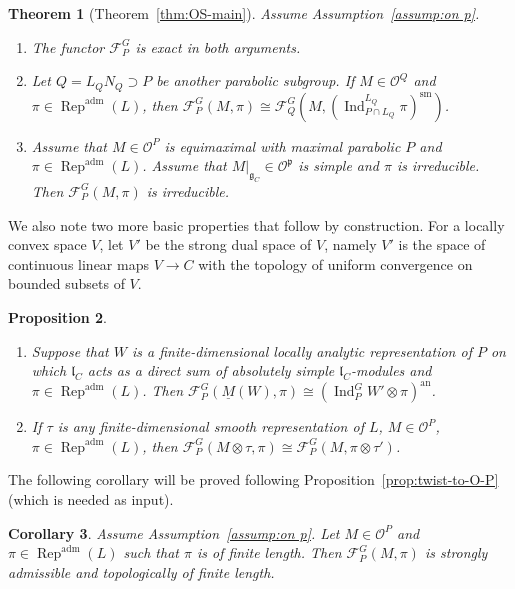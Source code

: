 \documentclass[a4paper]{amsart}
\numberwithin{equation}{section}
\newtheorem{thm}{Theorem}[section]
\newtheorem{prop}[thm]{Proposition}
\newtheorem{cor}[thm]{Corollary}
\theoremstyle{remark}
\theoremstyle{definition}
\DeclareMathOperator{\Ind}{Ind}
\DeclareMathOperator{\AnInd}{Ind}
\DeclareMathOperator{\Rep}{Rep}
\newcommand{\sm}{\mathrm{sm}}
\newcommand{\adm}{\mathrm{adm}}
\newcommand{\an}{\mathrm{an}}
\renewcommand{\simeq}{\cong}
\begin{document}
\begin{thm}[Theorem~\ref{thm:OS-main}]\label{thm:OS-main-in-main}
Assume Assumption~\ref{assump:on p}.
\begin{enumerate}
\item The functor $\mathcal{F}_{P}^{G}$ is exact in both arguments.
\item Let $Q = L_{Q}N_{Q}\supset P$ be another parabolic subgroup.
If $M\in \mathcal{O}^{Q}$ and $\pi\in\Rep^{\adm}(L)$, then $\mathcal{F}_{P}^{G}(M,\pi)\simeq \mathcal{F}_{Q}^{G}(M,(\Ind_{P \cap L_{Q}}^{L_{Q}}\pi)^{\sm})$.
\item Assume that $M\in \mathcal{O}^{P}$ is equimaximal with maximal parabolic $P$ and $\pi \in \Rep^{\adm}(L)$.
Assume that $M|_{\mathfrak{g}_{C}} \in \mathcal O^{\mathfrak p}$ is simple and $\pi$ is irreducible.
Then $\mathcal{F}_{P}^{G}(M,\pi)$ is irreducible.
\end{enumerate}
\end{thm}

We also note two more basic properties that follow by construction.
For a locally convex space $V$, let $V'$ be the strong dual space of $V$, namely $V'$ is the space of continuous linear maps $V\to C$ with the topology of uniform convergence on bounded subsets of $V$.

\begin{prop}\label{prop:OS-ind}\ 
  \begin{enumerate}
  \item Suppose that $W$ is a finite-dimensional locally analytic representation of $P$ on which $\mathfrak{l}_{C}$ acts as a direct sum of absolutely simple $\mathfrak{l}_{C}$-modules and $\pi \in \Rep^{\adm}(L)$.
    Then
    $\mathcal{F}_{P}^{G}(\underline M(W),\pi) \cong (\AnInd_{P}^{G}W'\otimes\pi)^{\an}$.
  \item If $\tau$ is any finite-dimensional smooth representation of $L$, $M \in \mathcal O^P$, $\pi \in \Rep^{\adm}(L)$, then
    $\mathcal F_P^G(M \otimes \tau,\pi) \cong \mathcal F_P^G(M,\pi \otimes \tau')$.
  \end{enumerate}
\end{prop}


The following corollary will be proved following Proposition~\ref{prop:twist-to-O-P} (which is needed as input).

\begin{cor}\label{cor:O-S-fin-length}
Assume Assumption~\ref{assump:on p}.
Let $M\in \mathcal{O}^{P}$ and $\pi\in \Rep^{\adm}(L)$ such that $\pi$ is of finite length.
Then $\mathcal{F}_{P}^{G}(M,\pi)$ is strongly admissible and topologically of finite length.
\end{cor}
\end{document}
